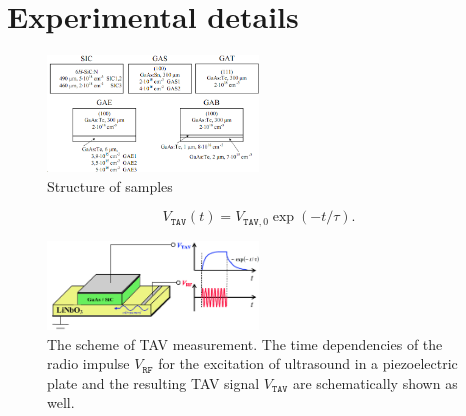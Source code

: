 \documentclass[final,3p,times,twocolumn,authoryear]{elsarticle}
\begin{document}
\cite{MW:Rev}

\cite{MW:Rev,BHUNIA1998}

\cite{BoltovetsEn,Pashkov1994En,Milenin1994En,BelyaevIntac,ProcSPIE,Konakova2015En,Konakova2012FTPEn}

\cite{Bacherikov2003En}

\cite{Bacherikov2003En,Belyaev1998JTFEn,Konakova2015En}

\cite{Milenin1994En}

\cite{Belyaev1998JTFEn}

\cite{Bacherikov2008En}

\cite{BelyaevIntac,ProcSPIE,Belyaev1998JTFEn}


\section{Experimental details}\label{sec2}

\cite{BoltovetsEn,Milenin1994En,BelyaevIntac,ASHKINADZE1996,ProcSPIE}


\begin{figure}
\center
\includegraphics[width=0.5\textwidth]{Fig1}
\caption{\label{figSamp_TAV}
Structure of samples}%
\end{figure}


\cite{OstrovPAN,OlikhSSC,PANnewEn,OstrovskiiSST}

\begin{equation}\label{eqVtav}
  V_\mathtt{TAV}(t)=V_{\mathtt{TAV},0}\exp(-t/\tau).
\end{equation}


\begin{figure}
\center
\includegraphics[width=0.5\textwidth]{fig2}
\caption{\label{figTAV}
The scheme of TAV measurement.
The time dependencies of the radio impulse $V_\mathtt{RF}$ for the excitation of ultrasound in a piezoelectric plate and the resulting TAV signal $V_\mathtt{TAV}$ are schematically shown as well.
}%
\end{figure}
\end{document}
